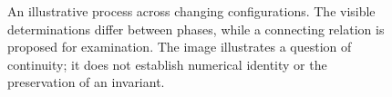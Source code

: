 \begin{figure}[htbp]

    \caption{An illustrative process across changing configurations.
    The visible determinations differ between phases, while a
    connecting relation is proposed for examination. The image
    illustrates a question of continuity; it does not establish
    numerical identity or the preservation of an invariant.}
    \label{fig:continuity-through-transformation}
\end{figure}

